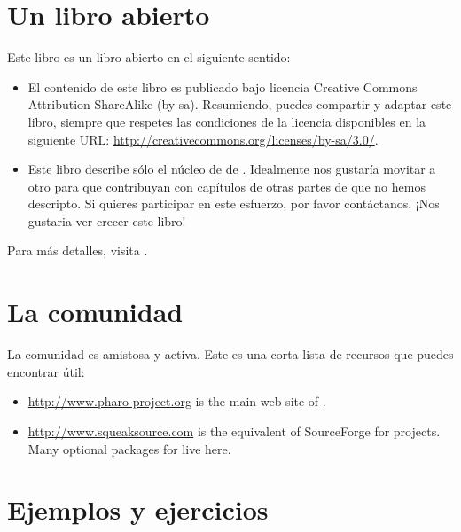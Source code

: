 \documentclass[a4paper,spanish, 10pt,twoside]{book}
\begin{document}
\section*{Un libro abierto}

Este libro es un libro abierto en el siguiente sentido:

\begin{itemize}

\item	El contenido de este libro es publicado bajo licencia Creative Commons Attribution-ShareAlike (by-sa).
		Resumiendo, puedes compartir y adaptar este libro, siempre que respetes las condiciones de la licencia disponibles en la siguiente URL: 
		\url{http://creativecommons.org/licenses/by-sa/3.0/}.

\item	Este libro describe sólo el núcleo de de \pharo.
		Idealmente nos gustaría movitar a otro para que contribuyan con capítulos
		de otras partes de \pharo que no hemos descripto.
		Si quieres participar en este esfuerzo, por favor contáctanos. ¡Nos gustaria ver crecer este libro!
\end{itemize}

Para más detalles, visita \pbe.

\section*{La comunidad \pharo}

La comunidad \pharo es amistosa y activa.
Este es una corta lista de recursos que puedes encontrar útil:

\begin{itemize}
\item \url{http://www.pharo-project.org} is the main web site of \pharo.

\item \url{http://www.squeaksource.com} is the equivalent of SourceForge for \pharo projects.
Many optional packages for \pharo live here.
\end{itemize}

\section*{Ejemplos y ejercicios}
\end{document}
